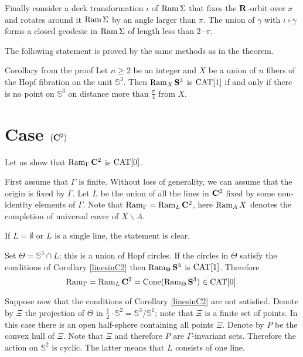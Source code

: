 \documentclass{compositio}
\begin{document}
Finally consider a deck transformation
$\iota$ of $\mathop{\rm Ram}\nolimits \Sigma$ that fixes  the $\mathbf{R}$-orbit over $x$
and rotates around it $\mathop{\rm Ram}\nolimits \Sigma$ by an angle larger than $\pi$.
The union of $\gamma$ with $\iota\circ\gamma$ forms a closed geodesic in
$\mathop{\rm Ram}\nolimits \Sigma$ of length less than $2{\cdot}\pi$.
\qeds

The following statement is proved by the same methods as in the theorem.

\begin{thm}{Corollary from the proof}\label{linesinC2} Let $n\ge 2$ be an integer
and $X$ be a union of $n$ fibers
 of the Hopf fibration on  the unit $\mathbb{S}^3$.
Then $\mathop{\rm Ram}\nolimits_{X}\mathbf{S}^3$ is $\mathrm{CAT}[1]$ if and only if there is no point on $\mathbb{S}^3$ on distance more than $\frac{\pi}{4}$ from $X$.
\end{thm}





\section{Case $(\mathbf{C}^2)$} \label{pkspaces}

Let us show that $\mathop{\rm Ram}\nolimits_{\Gamma}\mathbf{C}^2$ is $\mathrm{CAT}[0]$.

First assume that $\Gamma$ is finite.
Without loss of generality, we can assume that the origin is fixed by $\Gamma$.
Let $L$ be the union of all the lines in $\mathbf{C}^2$
fixed by some non-identity elements of $\Gamma$.
Note that $\mathop{\rm Ram}\nolimits_{\Gamma}=\mathop{\rm Ram}\nolimits_{L}\mathbf{C}^2$,
here $\mathop{\rm Ram}\nolimits_AX$ denotes the completion of universal cover of $X\backslash A$.

If $L=\emptyset$
or $L$ is a single line,
the statement is clear.

Set $\Theta=\mathbb{S}^3\cap L$; this
is a union of Hopf circles.
If the circles in $\Theta$
satisfy the conditions of
Corollary \ref{linesinC2} then $\mathop{\rm Ram}\nolimits_{\Theta} \mathbf{S}^3$ is $\mathrm{CAT}[1]$.
Therefore
\[\mathop{\rm Ram}\nolimits_\Gamma=\mathop{\rm Ram}\nolimits_L\mathbf{C}^2=\mathop{\rm Cone}\nolimits(\mathop{\rm Ram}\nolimits_{\Theta} \mathbf{S}^3)\in \mathrm{CAT}[0].\]


Suppose now that the conditions of
Corollary \ref{linesinC2} are not satisfied.
Denote by $\Xi$ the projection of $\Theta$ in $\tfrac12\cdot\mathbb{S}^2=\mathbb{S}^3/\mathbb{S}^1$;
note that $\Xi$ is a finite set of points.
In this case there is an open half-sphere containing all points $\Xi$.
Denote by $P$ be the convex hull of $\Xi$.
Note that $\Xi$ and therefore $P$ are $\Gamma$-invariant sets.
Therefore the action on $\mathbb{S}^2$ is cyclic.
The latter means that $L$ consists of one line.
\end{document}
